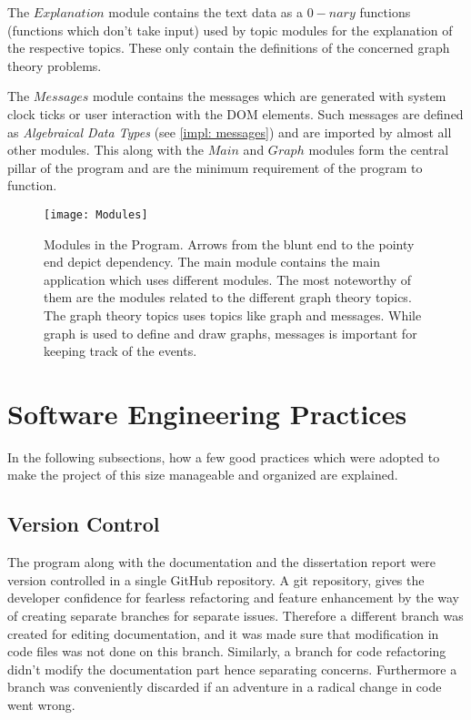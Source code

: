 The $Explanation$ module contains the text data as a $0-nary$ functions
(functions which don't take input) used by topic modules for the explanation of
the respective topics. These only contain the definitions of the concerned
graph theory problems.

The $Messages$ module contains the messages which are generated with system
clock ticks or user interaction with the DOM elements.  Such messages are
defined as \emph{Algebraical Data Types} (see \autoref{impl: messages}) and are
imported by almost all other modules. This along with the $Main$ and $Graph$
modules form the central pillar of the program and are the minimum requirement
of the program to function.

\begin{figure}[h]
\centering
\texttt{[image: Modules]}
\caption{
        Modules in the Program. Arrows from the blunt end to the pointy end
        depict dependency. The main module contains the main application which
        uses different modules.  The most noteworthy of them are the modules
        related to the different graph theory topics.  The graph theory topics
        uses topics like graph and messages.  While graph is used to define and
        draw graphs, messages is important for keeping track of the events.
        }
\end{figure}

\section{Software Engineering Practices}
In the following subsections, how a few good practices which were adopted to
make the project of this size manageable and organized are explained.

\subsection{Version Control}
The program along with the documentation and the dissertation report were
version controlled in a single GitHub repository. A git repository, gives the
developer confidence for fearless refactoring and feature enhancement by the
way of creating separate branches for separate issues. Therefore a different
branch was created for editing documentation, and it was made sure that
modification in code files was not done on this branch. Similarly, a branch for
code refactoring didn't modify the documentation part hence separating
concerns.  Furthermore a branch was conveniently discarded if an adventure in a
radical change in code went wrong.

